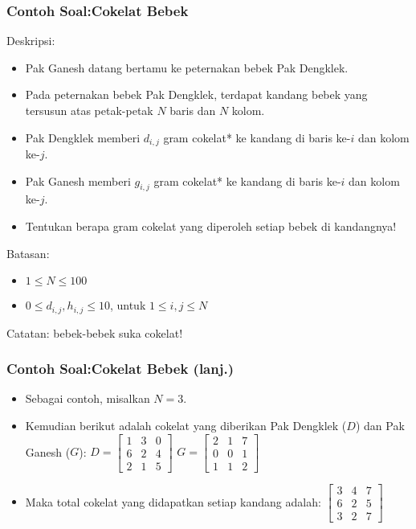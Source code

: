 \begin{frame}
\frametitle{Contoh Soal:\newline Cokelat Bebek}
Deskripsi:
\begin{itemize}
  \item Pak Ganesh datang bertamu ke peternakan bebek Pak Dengklek.
  \item Pada peternakan bebek Pak Dengklek, terdapat kandang bebek yang tersusun atas petak-petak $N$ baris dan $N$ kolom.
  \item Pak Dengklek memberi $d_{i,j}$ gram cokelat* ke kandang di baris ke-$i$ dan kolom ke-$j$.
  \item Pak Ganesh memberi $g_{i,j}$ gram cokelat* ke kandang di baris ke-$i$ dan kolom ke-$j$.
  \item Tentukan berapa gram cokelat yang diperoleh setiap bebek di kandangnya!
\end{itemize}
Batasan:
\begin{itemize}
  \item $1 \le N \le 100$
  \item $0 \le d_{i,j}, h_{i,j} \le 10$, untuk $1 \le i,j \le N$
\end{itemize}

\tiny *Catatan: bebek-bebek suka cokelat!
\end{frame}

\begin{frame}
\frametitle{Contoh Soal:\newline Cokelat Bebek (lanj.)}
\begin{itemize}
  \item Sebagai contoh, misalkan $N = 3$.
  \item Kemudian berikut adalah cokelat yang diberikan Pak Dengklek ($D$) dan Pak Ganesh ($G$):
  \vfill
  \(D =
  \left[\begin{matrix}
  1 & 3 & 0 \\
  6 & 2 & 4 \\
  2 & 1 & 5
  \end{matrix}\right]
  \)
  \hfil
  \(G =
  \left[\begin{matrix}
  2 & 1 & 7 \\
  0 & 0 & 1 \\
  1 & 1 & 2
  \end{matrix}\right]
  \) \centering
  \item Maka total cokelat yang didapatkan setiap kandang adalah:
  \vfill
  \(
  \left[\begin{matrix}
  3 & 4 & 7 \\
  6 & 2 & 5 \\
  3 & 2 & 7
  \end{matrix}\right]
  \) \centering
\end{itemize}
\end{frame}


